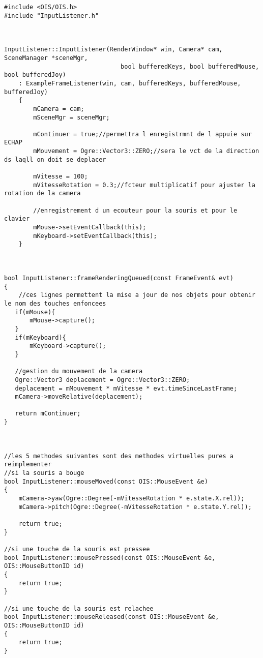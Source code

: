 \begin{lstlisting}[caption={InputListener.cpp}]



#include <OIS/OIS.h>
#include "InputListener.h"



InputListener::InputListener(RenderWindow* win, Camera* cam, SceneManager *sceneMgr,
                                bool bufferedKeys, bool bufferedMouse, bool bufferedJoy) 
    : ExampleFrameListener(win, cam, bufferedKeys, bufferedMouse, bufferedJoy)
    {
        mCamera = cam;
        mSceneMgr = sceneMgr;
        
        mContinuer = true;//permettra l enregistrmnt de l appuie sur ECHAP
        mMouvement = Ogre::Vector3::ZERO;//sera le vct de la direction ds laqll on doit se deplacer
        
        mVitesse = 100;
        mVitesseRotation = 0.3;//fcteur multiplicatif pour ajuster la rotation de la camera
       
        //enregistrement d un ecouteur pour la souris et pour le clavier
        mMouse->setEventCallback(this);
        mKeyboard->setEventCallback(this);
    }



bool InputListener::frameRenderingQueued(const FrameEvent& evt)
{
    //ces lignes permettent la mise a jour de nos objets pour obtenir le nom des touches enfoncees
   if(mMouse){
       mMouse->capture();
   }
   if(mKeyboard){
       mKeyboard->capture();
   }
   
   //gestion du mouvement de la camera
   Ogre::Vector3 deplacement = Ogre::Vector3::ZERO;
   deplacement = mMouvement * mVitesse * evt.timeSinceLastFrame;
   mCamera->moveRelative(deplacement);
    
   return mContinuer;
}



//les 5 methodes suivantes sont des methodes virtuelles pures a reimplementer
//si la souris a bouge
bool InputListener::mouseMoved(const OIS::MouseEvent &e)
{    
    mCamera->yaw(Ogre::Degree(-mVitesseRotation * e.state.X.rel));
    mCamera->pitch(Ogre::Degree(-mVitesseRotation * e.state.Y.rel));
    
    return true;
}

//si une touche de la souris est pressee
bool InputListener::mousePressed(const OIS::MouseEvent &e, OIS::MouseButtonID id)
{
    return true;
}

//si une touche de la souris est relachee 
bool InputListener::mouseReleased(const OIS::MouseEvent &e, OIS::MouseButtonID id)
{
    return true;
}


\end{lstlisting}
